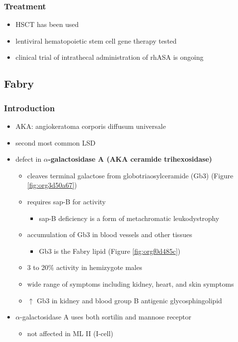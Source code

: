\documentclass[12pt]{scrartcl}
\begin{document}
\subsubsection{Treatment}
\label{sec:orgb5186a5}
\begin{itemize}
\item HSCT has been used
\item lentiviral hematopoietic stem cell gene therapy tested
\item clinical trial of intrathecal administration of rhASA is ongoing
\end{itemize}
\subsection{Fabry}
\label{sec:orgfeecb72}
\subsubsection{Introduction}
\label{sec:orgc999ef9}
\begin{itemize}
\item AKA: angiokeratoma corporis diffusum universale
\item second most common LSD
\item defect in \textbf{\(\alpha\)-galactosidase A (AKA ceramide trihexosidase)}
\begin{itemize}
\item cleaves terminal galactose from globotriaosylceramide (Gb3)
(Figure \ref{fig:org3d50a67})
\item requires sap-B for activity
\begin{itemize}
\item sap-B deficiency is a form of metachromatic leukodystrophy
\end{itemize}
\item accumulation of Gb3 in blood vessels and other tissues
\begin{itemize}
\item Gb3 is the Fabry lipid (Figure \ref{fig:orgf0d485c})
\end{itemize}
\item 3 to 20\% activity in hemizygote males
\item wide range of symptoms including kidney, heart, and skin symptoms
\item \(\uparrow\) Gb3 in kidney and blood group B antigenic glycosphingolipid
\end{itemize}
\item \(\alpha\)-galactosidase A uses both sortilin and mannose receptor
\begin{itemize}
\item not affected in ML II (I-cell)
\end{itemize}
\end{itemize}
\end{document}
